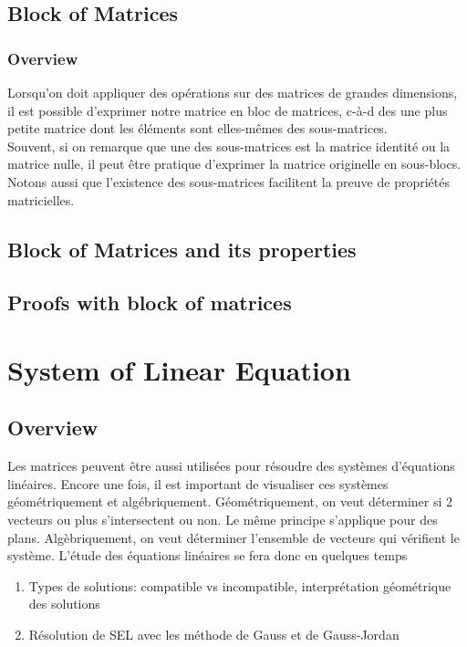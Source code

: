 \documentclass{article}
\begin{document}
\subsection{Block of Matrices}%
\label{sub:Block of Matrices}

\subsubsection{Overview}%
\label{ssub:Overview}

Lorsqu'on doit appliquer des opérations sur des matrices de grandes
dimensions, il est possible d'exprimer notre matrice en bloc de matrices,
c-à-d des une plus petite matrice dont les éléments sont elles-mêmes
des sous-matrices.\\

Souvent, si on remarque que une des sous-matrices est la matrice identité ou
la matrice nulle, il peut être pratique d'exprimer la matrice originelle
en sous-blocs.\\

Notons aussi que l'existence des sous-matrices facilitent la preuve de
propriétés matricielles.

\subsection{Block of Matrices and its properties}%
\label{sub:Block of Matrices and its properties}

\subsection{Proofs with block of matrices}%
\label{sub:Proofs with block of matrices}

\section{System of Linear Equation}

\subsection{Overview}%
\label{sub:Overview}

Les matrices peuvent être aussi utilisées pour résoudre des systèmes d'équations
linéaires. Encore une fois, il est important de visualiser ces systèmes
géométriquement et algébriquement. Géométriquement, on veut déterminer
si 2 vecteurs ou plus s'intersectent ou non. Le même principe s'applique pour
des plans. Algèbriquement, on veut déterminer l'ensemble de vecteurs qui
vérifient le système. L'étude des équations linéaires se fera donc en quelques
temps
\begin{enumerate}
    \item Types de solutions: compatible vs incompatible, interprétation
	géométrique des solutions
    \item Résolution de SEL avec les méthode de Gauss et de Gauss-Jordan
\end{enumerate}
\end{document}
